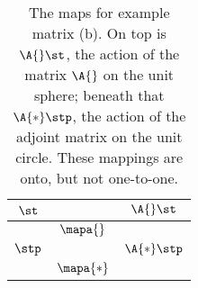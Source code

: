 \begin{table}[t]
\caption[The maps for example matrix (b)]{The maps for example matrix (b). On top is $\A{}\st$, the action of the matrix $\A{}$ on the unit sphere; beneath that $\A{*}\stp$, the action of the adjoint matrix on the unit circle. These mappings are onto, but not one-to-one.}
\begin{center}
\begin{tabular}{ccc}
%
  $\st$ & & $\A{} \st$ \\\hline
%
  \raisebox{-0.5\height}{\includegraphics[ width = 2.000in ] {images/ftola/"map unit circle"}} 
    \qquad & $\mapa{}$ & 
  \raisebox{-0.5\height}{\includegraphics[ width = 2.000in ] {images/ftola/"map a322 A"}} \\[100pt]
%
  $\stp$ & & $\A{*} \stp$ \\\hline
%
  \raisebox{-0.5\height}{\includegraphics[ width = 2.000in ] {images/ftola/"map unit sphere"}}
    \qquad & $\mapa{*}$ &
  \raisebox{-0.5\height}{\includegraphics[ width = 2.000in ] {images/ftola/"map a322 As"}}
%
\end{tabular}
\end{center}
\label{tab:ftola:maps:(b)}
\end{table}%


\endinput